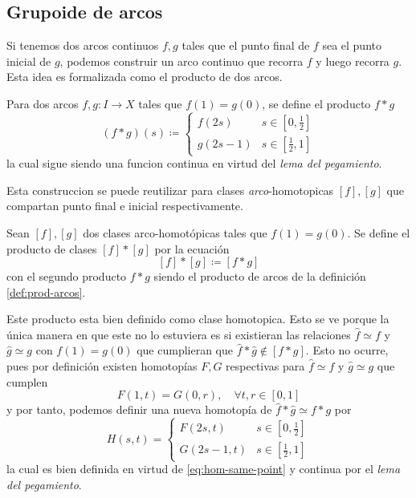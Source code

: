 \subsection{Grupoide de arcos}
Si tenemos dos arcos continuos \(f,g\) tales que el punto final de \(f\)
sea el punto inicial de \(g\), podemos construir un arco continuo que
recorra \(f\) y luego recorra \(g\). Esta idea es formalizada como
el producto de dos arcos.

\begin{definicion} \label{def:prod-arcos}
Para dos arcos \(f,g : I \to X\) tales que
\(f(1) = g(0)\), se define el producto \(f * g \)
\[ (f*g) (s) \coloneqq \begin{cases}
    f(2s) & s \in [0,\frac{1}{2}] \\
    g(2s - 1) & s \in [\frac{1}{2} , 1]
  \end{cases}
\]
la cual sigue siendo una funcion continua en virtud del \emph{lema del
pegamiento}.
\end{definicion}

Esta construccion se puede reutilizar para clases
\emph{arco}-homotopicas \([f],[g]\) que compartan punto final e inicial
respectivamente.
\begin{definicion}
  Sean \([f],[g]\) dos clases arco-homotópicas tales que \( f(1) =
  g(0)\). Se define el producto de clases \([f] * [g]\) por la ecuación
  \[ [f] * [g] \coloneqq [f * g] \]
  con el segundo producto \(f * g\) siendo el producto de arcos de la
  definición \ref{def:prod-arcos}.
\end{definicion}
\begin{acotacion}
  Este producto esta bien definido como clase homotopica. Esto se ve
  porque la única manera en que este no lo estuviera es si existieran las
  relaciones \(\hat f \simeq f\) y \(\hat g \simeq g\) con \(f(1) = g(0)\)
  que cumplieran que \(\hat f * \hat g \not \in [f * g]\). Esto no ocurre,
  pues por definición existen homotopías \(F,G\) respectivas para \(\hat f
  \simeq f\) y \(\hat g \simeq g\) que cumplen
  \begin{equation}
  F(1,t) = G(0,r) , \quad \forall t,r \in [0,1] \label{eq:hom-same-point}
  \end{equation}
  y por tanto, podemos definir una nueva homotopía de \(\hat f * \hat
  g \simeq f * g\) por
  \[
    H(s,t) = \begin{cases}
      F(2s,t) & s \in [0, \frac{1}{2}] \\
      G(2s - 1, t) & s \in [\frac{1}{2} , 1]
    \end{cases}
  \]
  la cual es bien definida en virtud de \eqref{eq:hom-same-point} y
  continua por el \emph{lema del pegamiento}.
\end{acotacion}

